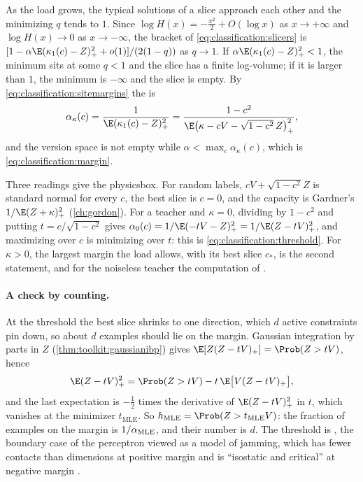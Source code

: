 \begin{refsection}
\begin{heuristic}
As the load grows, the typical solutions of a slice approach each other and the minimizing $q$ tends to $1$. Since $\log H(x)=-\frac{x^2}2+O(\log x)$ as $x\to+\infty$ and $\log H(x)\to0$ as $x\to-\infty$, the bracket of \eqref{eq:classification:slicers} is $[1-\alpha\E(\kappa_1(c)-Z)_+^2+o(1)]/(2(1-q))$ as $q\to1$. If $\alpha\E(\kappa_1(c)-Z)_+^2<1$, the minimum sits at some $q<1$ and the slice has a finite log-volume; if it is larger than $1$, the minimum is $-\infty$ and the slice is empty. By \eqref{eq:classification:sitemargins} the  is
\begin{equation}\label{eq:classification:slicecap}
\alpha_\kappa(c)=\frac1{\E(\kappa_1(c)-Z)_+^2}=\frac{1-c^2}{\E\bigl(\kappa-cV-\sqrt{1-c^2}\,Z\bigr)_+^2},
\end{equation}
and the version space is not empty while $\alpha<\max_c\alpha_\kappa(c)$, which is \eqref{eq:classification:margin}. \qedhere
\end{heuristic}

Three readings give the physicsbox. For random labels, $cV+\sqrt{1-c^2}Z$ is standard normal for every $c$, the best slice is $c=0$, and the capacity is Gardner's $1/\E(Z+\kappa)_+^2$ (\cref{ch:gordon}). For a teacher and $\kappa=0$, dividing by $1-c^2$ and putting $t=c/\sqrt{1-c^2}$ gives $\alpha_0(c)=1/\E(-tV-Z)_+^2=1/\E(Z-tV)_+^2$, and maximizing over $c$ is minimizing over $t$: this is \eqref{eq:classification:threshold}. For $\kappa>0$, the largest margin the load allows, with its best slice $c_*$, is the second statement, and for the noiseless teacher the computation of \textcite{OpperEtAl1990}.

\paragraph{A check by counting.} At the threshold the best slice shrinks to one direction, which $d$ active constraints pin down, so about $d$ examples should lie on the margin. Gaussian integration by parts in $Z$ (\cref{thm:toolkit:gaussianibp}) gives $\E[Z(Z-tV)_+]=\Prob(Z>tV)$, hence
\[
\E(Z-tV)_+^2=\Prob(Z>tV)-t\,\E\bigl[V(Z-tV)_+\bigr],
\]
and the last expectation is $-\frac12$ times the derivative of $\E(Z-tV)_+^2$ in $t$, which vanishes at the minimizer $t_{\mathrm{MLE}}$. So $\classificationh=\Prob(Z>t_{\mathrm{MLE}}V)$: the fraction of examples on the margin is $1/\alpha_{\mathrm{MLE}}$, and their number is $d$. The threshold is , the boundary case of the perceptron viewed as a model of jamming, which has fewer contacts than dimensions at positive margin and is \enquote{isostatic and critical} at negative margin \parencite{FranzParisi2016}.


\end{refsection}
